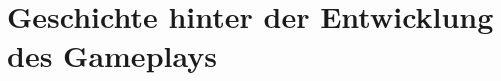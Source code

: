 
\section{Geschichte hinter der Entwicklung des Gameplays}\label{sec:gameplay-geschichte}

\renewcommand{\kapitelautor}{Autor: Irgendwer} %

%
%

\renewcommand{\kapitelautor}{}
